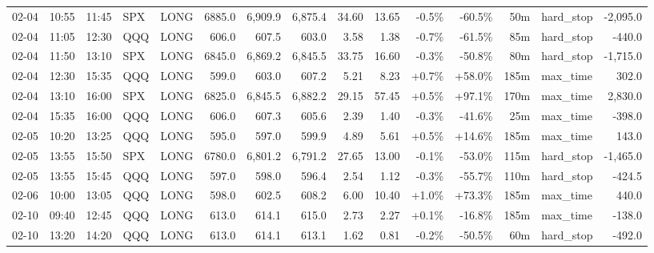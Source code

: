 \documentclass[11pt,a4paper,twoside]{article}
\begin{document}
\begin{landscape}
\begin{center}
\begin{longtable}{>{\color{txtmain}}l l l l l r r r r r r r r >{\color{txtmain}}l r}
02-04 & 10:55 & 11:45 & SPX & LONG & 6885.0 & 6,909.9 & 6,875.4 & 34.60 & 13.65 & \textcolor{lossred}{-0.5\%} & \textcolor{lossred}{-60.5\%} & 50m & hard\_stop & \textcolor{lossred}{-2,095.0} \\
02-04 & 11:05 & 12:30 & QQQ & LONG & 606.0 & 607.5 & 603.0 & 3.58 & 1.38 & \textcolor{lossred}{-0.7\%} & \textcolor{lossred}{-61.5\%} & 85m & hard\_stop & \textcolor{lossred}{-440.0} \\
02-04 & 11:50 & 13:10 & SPX & LONG & 6845.0 & 6,869.2 & 6,845.5 & 33.75 & 16.60 & \textcolor{lossred}{-0.3\%} & \textcolor{lossred}{-50.8\%} & 80m & hard\_stop & \textcolor{lossred}{-1,715.0} \\
02-04 & 12:30 & 15:35 & QQQ & LONG & 599.0 & 603.0 & 607.2 & 5.21 & 8.23 & \textcolor{wingreen}{+0.7\%} & \textcolor{wingreen}{+58.0\%} & 185m & max\_time & \textcolor{wingreen}{302.0} \\
02-04 & 13:10 & 16:00 & SPX & LONG & 6825.0 & 6,845.5 & 6,882.2 & 29.15 & 57.45 & \textcolor{wingreen}{+0.5\%} & \textcolor{wingreen}{+97.1\%} & 170m & max\_time & \textcolor{wingreen}{2,830.0} \\
02-04 & 15:35 & 16:00 & QQQ & LONG & 606.0 & 607.3 & 605.6 & 2.39 & 1.40 & \textcolor{lossred}{-0.3\%} & \textcolor{lossred}{-41.6\%} & 25m & max\_time & \textcolor{lossred}{-398.0} \\
02-05 & 10:20 & 13:25 & QQQ & LONG & 595.0 & 597.0 & 599.9 & 4.89 & 5.61 & \textcolor{wingreen}{+0.5\%} & \textcolor{wingreen}{+14.6\%} & 185m & max\_time & \textcolor{wingreen}{143.0} \\
02-05 & 13:55 & 15:50 & SPX & LONG & 6780.0 & 6,801.2 & 6,791.2 & 27.65 & 13.00 & \textcolor{lossred}{-0.1\%} & \textcolor{lossred}{-53.0\%} & 115m & hard\_stop & \textcolor{lossred}{-1,465.0} \\
02-05 & 13:55 & 15:45 & QQQ & LONG & 597.0 & 598.0 & 596.4 & 2.54 & 1.12 & \textcolor{lossred}{-0.3\%} & \textcolor{lossred}{-55.7\%} & 110m & hard\_stop & \textcolor{lossred}{-424.5} \\
02-06 & 10:00 & 13:05 & QQQ & LONG & 598.0 & 602.5 & 608.2 & 6.00 & 10.40 & \textcolor{wingreen}{+1.0\%} & \textcolor{wingreen}{+73.3\%} & 185m & max\_time & \textcolor{wingreen}{440.0} \\
02-10 & 09:40 & 12:45 & QQQ & LONG & 613.0 & 614.1 & 615.0 & 2.73 & 2.27 & \textcolor{wingreen}{+0.1\%} & \textcolor{lossred}{-16.8\%} & 185m & max\_time & \textcolor{lossred}{-138.0} \\
02-10 & 13:20 & 14:20 & QQQ & LONG & 613.0 & 614.1 & 613.1 & 1.62 & 0.81 & \textcolor{lossred}{-0.2\%} & \textcolor{lossred}{-50.5\%} & 60m & hard\_stop & \textcolor{lossred}{-492.0} \\

\end{longtable}
\end{center}
\end{landscape}
\end{document}
